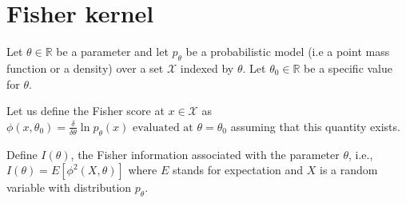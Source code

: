 \documentclass[11pt]{article}
\begin{document}
\section{Fisher kernel} 
Let $\theta \in \mathbb{R}$ be a parameter and let $p_\theta$ be a probabilistic model (i.e a point mass function or a density) over a set $\mathcal{X}$ indexed by $\theta$. Let $\theta_0 \in \mathbb{R}$ be a specific value for $\theta$.

Let us define the Fisher score at $x \in \mathcal{X}$ as
$\phi(x,\theta_0) = \frac{\delta}{\delta \theta} \ln p_\theta(x) \mbox{ evaluated at } \theta=\theta_0$
assuming that this quantity exists. 

Define $I(\theta)$, the Fisher information associated with the parameter $\theta$, i.e., 
$I(\theta)=E[\phi^2(X,\theta)]$
where $E$ stands for expectation and $X$ is a random variable with distribution $p_\theta$. 
\end{document}
